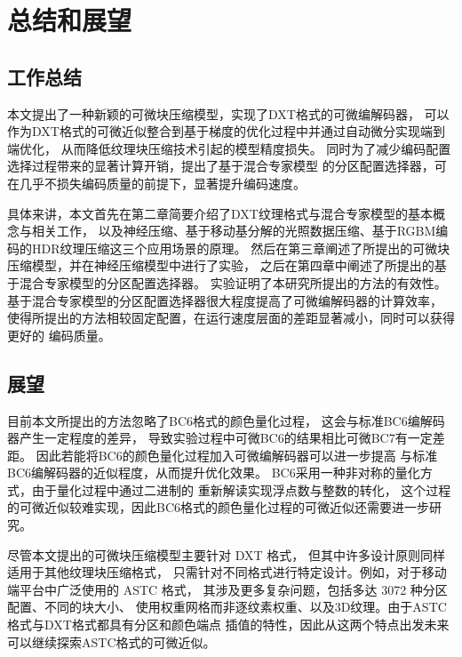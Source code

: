 
\chapter{总结和展望}

\section{工作总结}

本文提出了一种新颖的可微块压缩模型，实现了DXT格式的可微编解码器，
可以作为DXT格式的可微近似整合到基于梯度的优化过程中并通过自动微分实现端到端优化，
从而降低纹理块压缩技术引起的模型精度损失。
同时为了减少编码配置选择过程带来的显著计算开销，提出了基于混合专家模型
的分区配置选择器，可在几乎不损失编码质量的前提下，显著提升编码速度。

具体来讲，本文首先在第二章简要介绍了DXT纹理格式与混合专家模型的基本概念与相关工作，
以及神经压缩、基于移动基分解的光照数据压缩、基于RGBM编码的HDR纹理压缩这三个应用场景的原理。
然后在第三章阐述了所提出的可微块压缩模型，并在神经压缩模型中进行了实验，
之后在第四章中阐述了所提出的基于混合专家模型的分区配置选择器。
实验证明了本研究所提出的方法的有效性。
基于混合专家模型的分区配置选择器很大程度提高了可微编解码器的计算效率，
使得所提出的方法相较固定配置，在运行速度层面的差距显著减小，同时可以获得更好的
编码质量。

\section{展望}

目前本文所提出的方法忽略了BC6格式的颜色量化过程，
这会与标准BC6编解码器产生一定程度的差异，
导致实验过程中可微BC6的结果相比可微BC7有一定差距。
因此若能将BC6的颜色量化过程加入可微编解码器可以进一步提高
与标准BC6编解码器的近似程度，从而提升优化效果。
BC6采用一种非对称的量化方式，由于量化过程中通过二进制的
重新解读实现浮点数与整数的转化，
这个过程的可微近似较难实现，因此BC6格式的颜色量化过程的可微近似还需要进一步研究。

尽管本文提出的可微块压缩模型主要针对 DXT 格式，
但其中许多设计原则同样适用于其他纹理块压缩格式，
只需针对不同格式进行特定设计。例如，对于移动端平台中广泛使用的 ASTC 格式，
其涉及更多复杂问题，包括多达 3072 种分区配置、不同的块大小、
使用权重网格而非逐纹素权重、以及3D纹理。由于ASTC格式与DXT格式都具有分区和颜色端点
插值的特性，因此从这两个特点出发未来可以继续探索ASTC格式的可微近似。



